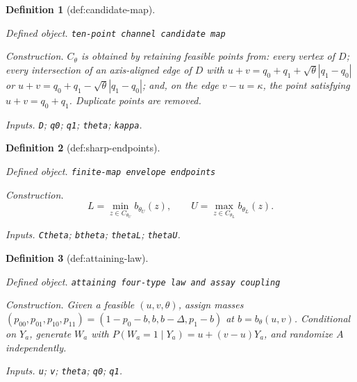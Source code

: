 \documentclass{article}
\newtheorem{definition}{Definition}
\begin{document}
\begin{definition}[def:candidate-map]\label{def:candidate-map}
\par\smallskip\noindent\emph{Defined object.} \texttt{ten-\allowbreak{}point channel candidate map}
\par\smallskip\noindent\emph{Construction.} \(C_{\theta}\) is obtained by retaining feasible points from: every vertex of \(D\); every intersection of an axis-aligned edge of \(D\) with \(u+v=q_0+q_1+\sqrt{\theta}|q_1-q_0|\) or \(u+v=q_0+q_1-\sqrt{\theta}|q_1-q_0|\); and, on the edge \(v-u=\kappa\), the point satisfying \(u+v=q_0+q_1\). Duplicate points are removed.
\par\smallskip\noindent\emph{Inputs.} \texttt{D}; \texttt{q0}; \texttt{q1}; \texttt{theta}; \texttt{kappa}.
\end{definition}

\begin{definition}[def:sharp-endpoints]\label{def:sharp-endpoints}
\par\smallskip\noindent\emph{Defined object.} \texttt{finite-\allowbreak{}map envelope endpoints}
\par\smallskip\noindent\emph{Construction.} \[L=\min_{z\in C_{\theta_U}}b_{\theta_U}(z),\qquad U=\max_{z\in C_{\theta_L}}b_{\theta_L}(z).\]
\par\smallskip\noindent\emph{Inputs.} \texttt{Ctheta}; \texttt{btheta}; \texttt{thetaL}; \texttt{thetaU}.
\end{definition}

\begin{definition}[def:attaining-law]\label{def:attaining-law}
\par\smallskip\noindent\emph{Defined object.} \texttt{attaining four-\allowbreak{}type law and assay coupling}
\par\smallskip\noindent\emph{Construction.} Given a feasible \((u,v,\theta)\), assign masses \((p_{00},p_{01},p_{10},p_{11})=(1-p_0-b,b,b-\Delta,p_1-b)\) at \(b=b_{\theta}(u,v)\). Conditional on \(Y_a\), generate \(W_a\) with \(P(W_a=1\mid Y_a)=u+(v-u)Y_a\), and randomize \(A\) independently.
\par\smallskip\noindent\emph{Inputs.} \texttt{u}; \texttt{v}; \texttt{theta}; \texttt{q0}; \texttt{q1}.
\end{definition}
\end{document}

